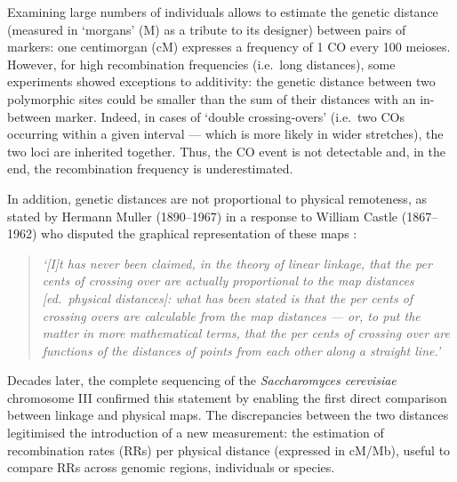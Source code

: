 Examining large numbers of individuals allows to estimate the genetic distance (measured in ‘morgans’ (M) as a tribute to its designer) between pairs of markers: one centimorgan (cM) expresses a frequency of 1 CO every 100 meioses.
However, for high recombination frequencies (i.e.\ long distances), some experiments \citep[e.g.][]{morgan1911random,morgan1912data} showed exceptions to additivity: the genetic distance between two polymorphic sites could be smaller than the sum of their distances with an in-between marker.
Indeed, in cases of ‘double crossing-overs’ (i.e.\ two COs occurring within a given interval — which is more likely in wider stretches), the two loci are inherited together.
Thus, the CO event is not detectable and, in the end, the recombination frequency is underestimated.

In addition, genetic distances are not proportional to physical remoteness, as stated by Hermann Muller (1890--1967) \citep{muller1920are} in a response to William Castle (1867--1962) who disputed the graphical representation of these maps \citep[reviewed in \citealp{vorms2013models}]{castle1919are,castle1919arrangement}:

\begin{quote}
\textit{‘[I]t has never been claimed, in the theory of linear linkage, that the per cents of crossing over are actually proportional to the map distances [ed.\ physical distances]:  what has been stated is that the per cents of crossing overs are calculable from the map distances — or, to put the matter in more mathematical terms, that the per cents of crossing over are functions of the distances of points from each other along a straight line.’}
\end{quote}


Decades later, the complete sequencing of the \textit{Saccharomyces cerevisiae} chromosome III \citep{oliver1992complete} confirmed this statement by enabling the first direct comparison between linkage and physical maps. 
The discrepancies between the two distances legitimised the introduction of a new measurement: the estimation of recombination rates (RRs) per physical distance (expressed in cM/Mb), useful to compare RRs across genomic regions, individuals or species.\\

